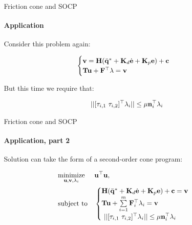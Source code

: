\documentclass{beamer}
\begin{document}
\begin{frame}{Friction cone and SOCP}
\framesubtitle{Application}
\begin{flushleft}

Consider this problem again:

\begin{equation}
\begin{cases}
    \mathbf{v} = \mathbf{H}(\ddot{\mathbf{q}}^* + \mathbf{K}_d\dot{\mathbf{e}} + \mathbf{K}_p\mathbf{e}) + \mathbf{c} \\
    \mathbf{T}\mathbf{u} + \mathbf{F}^\top \lambda = \mathbf{v}
\end{cases}
\end{equation}

But this time we require that:

\begin{equation}
    || [\tau_{i,1} \ \tau_{i,2}]^\top \lambda_i || \leq \mu \mathbf{n}_i^\top \lambda_i
\end{equation}


\end{flushleft}
\end{frame}



\begin{frame}{Friction cone and SOCP}
\framesubtitle{Application, part 2}
\begin{flushleft}

Solution can take the form of a second-order cone program:

\begin{equation}
\begin{aligned}
& \underset{\mathbf{u}, \mathbf{v}, \lambda_i}{\text{minimize}}
& & \mathbf{u}^\top \mathbf{u}, \\
& \text{subject to}
& & \begin{cases}
    \mathbf{H}(\ddot{\mathbf{q}}^* + \mathbf{K}_d\dot{\mathbf{e}} + \mathbf{K}_p\mathbf{e}) + \mathbf{c} = \mathbf{v} \\
    \mathbf{T}\mathbf{u} + \sum\limits_{i = 1}^m \mathbf{F}_i^\top \lambda_i = \mathbf{v} \\\
    || [\tau_{i,1} \ \tau_{i,2}]^\top \lambda_i || \leq \mu \mathbf{n}_i^\top \lambda_i
\end{cases}
\end{aligned}
\end{equation}


\end{flushleft}
\end{frame}
\end{document}
